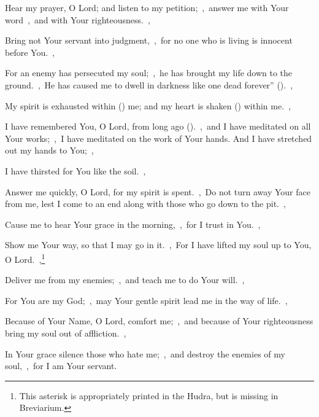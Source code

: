 \documentclass[12pt,twoside,a5paper]{article}
\begin{document}
\begin{normalparskip}
  Hear my prayer, O Lord; and listen to my petition;~\sep\ answer me with Your word~\sep\ and with Your righteousness.~\sep


  Bring not Your servant into judgment,~\sep\ for no one who is living is innocent before You.~\sep

  For an enemy has persecuted my soul;~\sep\ he has brought my life down to the ground.~\sep\ He has caused me to dwell in darkness like one dead forever'' ().~\sep

  My spirit is exhausted within () me; and my heart is shaken () within me.~\sep

  I have remembered You, O Lord, from long ago ().~\sep\ and I have meditated on all Your works;~\sep\ I have meditated on the work of Your hands. And I have stretched out my hands to You;~\sep

  I have thirsted for You like the soil.~\sep

  Answer me quickly, O Lord, for my spirit is spent.~\sep\ Do not turn away Your face from me, lest I come to an end along with those who go down to the pit.~\sep

  Cause me to hear Your grace in the morning,~\sep\ for I trust in You.~\sep

  Show me Your way, so that I may go in it.~\sep\ For I have lifted my soul up to You, O Lord.~\sep\footnote{This asterisk is appropriately printed in the Hudra, but is missing in Breviarium.}

  Deliver me from my enemies;~\sep\ and teach me to do Your will.~\sep

  For You are my God;~\sep\ may Your gentle spirit lead me in the way of life.~\sep

  Because of Your Name, O Lord, comfort me;~\sep\ and because of Your righteousness bring my soul out of affliction.~\sep

  In Your grace silence those who hate me;~\sep\ and destroy the enemies of my soul,~\sep\ for I am Your servant.
\end{normalparskip}

\end{document}
